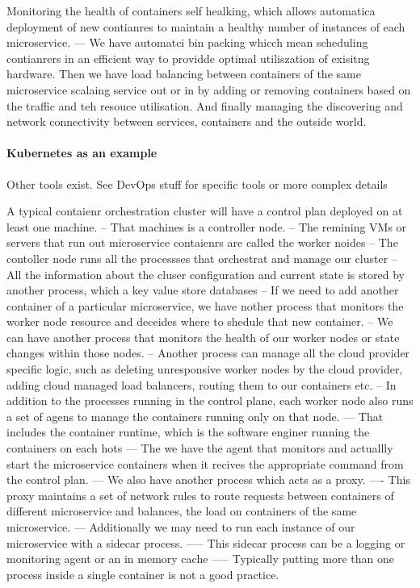 \documentclass[a4paper, 11pt]{book}
\begin{document}
    Monitoring the health of containers self healking, which allows automatica deployment of new contianres to maintain a healthy number of instances of each microservice.
    --- We have automatci bin packing whicch mean scheduling contianrers in an efficient way to providde optimal utiliszation of exisitng hardware.
    Then we have load balancing between containers of the same microservice scalaing service out or in by adding or removing containers based on the traffic and teh resouce utilisation.
    And finally managing the discovering and network connectivity between services, containers and the outside world.

    \paragraph{Kubernetes as an example}
    Other tools exist. See DevOps stuff for specific tools or more complex details

    A typical contaienr orchestration cluster will have a control plan deployed on at least one machine.
    -- That machines is a controller node.
    -- The remining VMs or servers that run out microservice contaienrs are called the worker noides
    -- The contoller node runs all the processses that orchestrat and manage our cluster
    -- All the information about the cluser configuration and current state is stored by another process, which a key value store databases
    -- If we need to add another container of a particular microservice, we have nother process that monitors the worker node resource and deceides where to shedule that new container.
    -- We can have another process that monitors the health of our worker nodes or state changes within those nodes.
    -- Another process can manage all the cloud provider specific logic, such as deleting unresponsive worker nodes by the cloud provider, adding cloud managed load balancers, routing them to our containers etc.
    -- In addition to the processes running in the control plane, each worker node also runs a set of agens to manage the containers running only on that node.
    --- That includes the container runtime, which is the software enginer running the containers on each hots
    --- The we have the agent that monitors and actuallly start the microservice containers when it recives the appropriate command from the control plan.
    --- We also have another process which acts as a proxy.
    ---- This proxy maintains a set of network rules to route requests between containers of different microservice and balances, the load on containers of the same microservice.
    --- Additionally we may need to run each instance of our microservice with a sidecar process.
    ----- This sidecar process can be a logging or monitoring agent or an in memory cache
    ----- Typically putting more than one process inside a single container is not a good practice.
\end{document}

